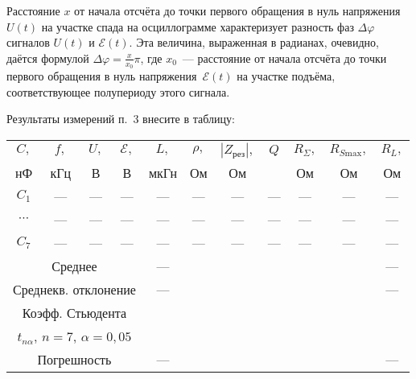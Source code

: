 \begin{lab:task}
    Расстояние $x$ от начала отсчёта до точки первого обращения в нуль
напряжения $U(t)$ на участке спада на осциллограмме характеризует разность фаз
$\Delta\varphi$ сигналов $U(t)$ и $\mathcal{E}(t).$ Эта величина, выраженная в
радианах, очевидно, даётся формулой $\Delta\varphi=\frac{x}{x_0}\pi$, где
$x_0$~--- расстояние от начала отсчёта до точки первого обращения в нуль
напряжения~$\mathcal{E}(t)$ на участке подъёма, соответствующее полупериоду
этого сигнала.


	\item Результаты измерений п.~3 внесите в таблицу:\par
\begingroup
\noindent\small \begin{tabular}{|c|c|c|c|c|c|c|c|c|c|c|}
	                \hline
	                $C,$ & $f,$ & $U,$ & $\mathcal{E},$ & $L,$ &
$\rho,$ & $|Z_{\text{рез}}|,$& $Q$ & $R_{\Sigma},$ & $R_{S
\text{max}},$& $R_L,$\\

	                нФ & кГц & В & В & мкГн & Ом & Ом &  & Ом & Ом & Ом \\
	                \hline
	                $C_1$ & --- & --- & --- & --- & --- & --- & --- & --- & --- & --- \\
	                \hline
	                $\cdots$ & --- & --- & --- & --- & --- & --- & --- & ---& --- & --- \\
	                \hline
	                $C_7$& --- & --- & --- & --- & --- & --- & ---& --- &--- &---\\
	                \hline
	                \multicolumn{4}{|c|}{Среднее} & --- & & & & & & --- \\
	                \hline
	                \multicolumn{4}{|c|}{Среднекв. отклонение} & ---& & & & & &--- \\
			                    \hline
\multicolumn{4}{|c|}{Коэфф. Стьюдента} & & & & & & & \\
\multicolumn{4}{|c|}{$t_{n\alpha}$, $n=7$, $\alpha=0,05$} & & & & & & & \\ \hline
	                \multicolumn{4}{|c|}{Погрешность} & ---& & & & & &---\\
	                \hline
	            \end{tabular}\par
\endgroup
{}


\end{lab:task}
